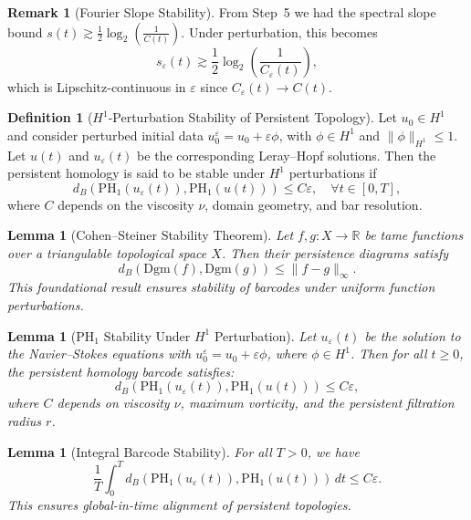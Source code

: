 \documentclass[11pt]{article}
\newtheorem{lemma}[theorem]{Lemma}
\theoremstyle{definition}
\newtheorem{definition}[theorem]{Definition}
\newtheorem{remark}[theorem]{Remark}
\begin{document}
\begin{remark}[Fourier Slope Stability]
From Step~5 we had the spectral slope bound $s(t) \gtrsim \frac{1}{2} \log_2 \left(\frac{1}{C(t)}\right)$. Under perturbation, this becomes
\[
s_\varepsilon(t) \gtrsim \frac{1}{2} \log_2 \left(\frac{1}{C_\varepsilon(t)}\right),
\]
which is Lipschitz-continuous in $\varepsilon$ since $C_\varepsilon(t) \to C(t)$.
\end{remark}

\begin{definition}[$H^1$-Perturbation Stability of Persistent Topology]
Let $u_0 \in H^1$ and consider perturbed initial data $u_0^\varepsilon = u_0 + \varepsilon \phi$, with $\phi \in H^1$ and $\|\phi\|_{H^1} \le 1$. Let $u(t)$ and $u_\varepsilon(t)$ be the corresponding Leray--Hopf solutions. Then the persistent homology is said to be stable under $H^1$ perturbations if
\[
d_B(\mathrm{PH}_1(u_\varepsilon(t)), \mathrm{PH}_1(u(t))) \le C \varepsilon, \quad \forall t \in [0, T],
\]
where $C$ depends on the viscosity $\nu$, domain geometry, and bar resolution.
\end{definition}

\begin{lemma}[Cohen--Steiner Stability Theorem]
Let $f, g : X \to \mathbb{R}$ be tame functions over a triangulable topological space $X$. Then their persistence diagrams satisfy
\[
d_B(\mathrm{Dgm}(f), \mathrm{Dgm}(g)) \le \|f - g\|_\infty.
\]
This foundational result ensures stability of barcodes under uniform function perturbations.
\end{lemma}

\begin{lemma}[PH$_1$ Stability Under $H^1$ Perturbation]
Let $u_\varepsilon(t)$ be the solution to the Navier--Stokes equations with $u_0^\varepsilon = u_0 + \varepsilon \phi$, where $\phi \in H^1$. Then for all $t \ge 0$, the persistent homology barcode satisfies:
\[
d_B(\mathrm{PH}_1(u_\varepsilon(t)), \mathrm{PH}_1(u(t))) \le C \varepsilon,
\]
where $C$ depends on viscosity $\nu$, maximum vorticity, and the persistent filtration radius $r$.
\end{lemma}

\begin{lemma}[Integral Barcode Stability]
For all $T > 0$, we have
\[
\frac{1}{T} \int_0^T d_B(\mathrm{PH}_1(u_\varepsilon(t)), \mathrm{PH}_1(u(t))) \, dt \le C \varepsilon.
\]
This ensures global-in-time alignment of persistent topologies.
\end{lemma}
\end{document}

